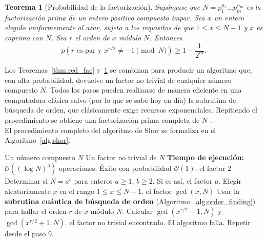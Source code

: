 \documentclass[12pt, spanish]{book}
\newtheorem{teorema}{Teorema}
\begin{document}
\begin{teorema}[Probabilidad de la factorización]
    \label{thm:prob_fac}
    Supóngase que $N = p_1^{\alpha_1} \dots p_m^{\alpha_m}$ es la factorización prima de un entero positivo compuesto impar. Sea $x$ un entero elegido uniformemente al azar, sujeto a los requisitos de que $1 \leq x \leq N - 1$ y $x$ es coprimo con $N$. Sea $r$ el orden de $x$ módulo $N$. Entonces
    \begin{equation}
        p(r \text{ es par y } x^{r/2} \neq -1 \pmod{N}) \geq 1 - \frac{1}{2^m}.
    \end{equation}
    \label{eq:probabilidad}
\end{teorema}
\vspace{-0.8cm}
Los Teoremas~\ref{thm:red_fac} y~\ref{thm:prob_fac} se combinan para producir un algoritmo que, con alta probabilidad, devuelve un factor no trivial de cualquier número compuesto $N$. Todos los pasos pueden realizarse de manera eficiente en una computadora clásica salvo (por lo que se sabe hoy en día) la subrutina de búsqueda de orden, que clásicamente exige recursos exponenciales. Repitiendo el procedimiento se obtiene una factorización prima completa de $N$ \cite{Nielsen2024}.\\

El procedimiento completo del algoritmo de Shor se formaliza en el Algoritmo~\ref{alg:shor}.

\begin{algorithm}[H]
    \caption{Reducción de la factorización a la búsqueda de orden \cite{Nielsen2024}}
    \label{alg:shor}
    \begin{algorithmic}[1]
        \Require Un número compuesto $N$
        \Ensure Un factor no trivial de $N$
        \Statex \textbf{Tiempo de ejecución:} $\mathcal{O}((\log N)^3)$ operaciones. Éxito con probabilidad $\mathcal{O}(1)$.
        \Statex
        \State \Return el factor $2$
        \EndIf
        \State Determinar si $N = a^b$ para enteros $a \geq 1$, $b \geq 2$. Si es así, \Return el factor $a$.
        \State Elegir aleatoriamente $x$ en el rango $1 \leq x \leq N-1$.
        \State \Return el factor $\gcd(x, N)$
        \EndIf
        \State Usar la \textbf{subrutina cuántica de búsqueda de orden} (Algoritmo~\ref{alg:order_finding}) para hallar el orden $r$ de $x$ módulo $N$.
        \State Calcular $\gcd(x^{r/2} - 1, N)$ y $\gcd(x^{r/2} + 1, N)$.
        \State \Return el factor no trivial encontrado.
        \Else
        \State El algoritmo falla. Repetir desde el paso 9.
        \EndIf
    \end{algorithmic}
\end{algorithm}
\end{document}
